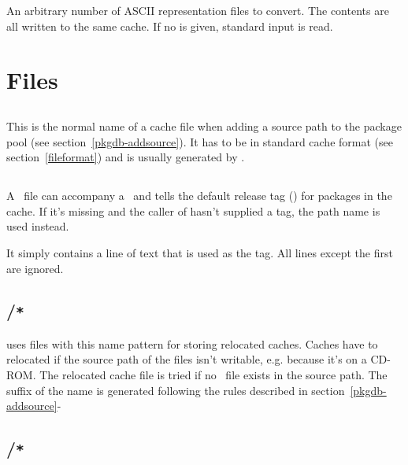 \documentclass[10pt]{article}
\begin{document}
An arbitrary number of ASCII representation files to convert. The
contents are all written to the same cache. If no  is
given, standard input is read.

\endsynopsis



\section{Files}

\subsection{\INFOFILENAME}

This is the normal name of a cache file when adding a source path to
the package pool (see section~\ref{pkgdb-addsource}). It has to be in
standard cache format (see section~\ref{fileformat}) and is usually
generated by \MKSUMPROG. 

\subsection{\RELEASEFILENAME}

A \RELEASEFILENAME\ file can accompany a \INFOFILENAME\ and tells the
default release tag () for packages in the cache. If
it's missing and the caller of  hasn't supplied a
tag, the path name is used instead.

It simply contains a line of text that is used as the tag. All lines
except the first are ignored.

\subsection{\PKGDBVLIBPATH\slash\RCACHEPREFIX\texttt{*}}

 uses files with this name pattern for storing
relocated caches. Caches have to relocated if the source path of the
 files isn't writable, e.g. because it's on a CD-ROM. The
relocated cache file is tried if no \INFOFILENAME\ file exists in the
source path. The suffix of the name is generated following the rules
described in section~\ref{pkgdb-addsource}-

\subsection{\PKGDBVLIBPATH\slash\RRELEASEPREFIX\texttt{*}}
\end{document}
